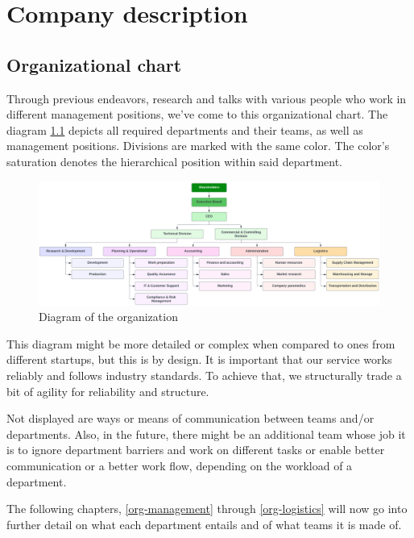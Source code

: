 \chapter{Company description}
\section{Organizational chart}\label{org-chart}
Through previous endeavors, research and talks with various people who work in different management positions, we've come to this organizational chart. The diagram \ref{fig:organisational-chart} depicts all required departments and their teams, as well as management positions. Divisions are marked with the same color. The color's saturation denotes the hierarchical position within said department.

\begin{figure}[!ht]
  \centering
  \includegraphics[width=\linewidth]{./images/organisational-chart.png}
  \caption[Organizational chart made with lucidchart.com]{Diagram of the organization}
  \label{fig:organisational-chart}
\end{figure}

This diagram might be more detailed or complex when compared to ones from different startups, but this is by design. It is important that our service works reliably and follows industry standards. To achieve that, we structurally trade a bit of agility for reliability and structure.

Not displayed are ways or means of communication between teams and/or departments. Also, in the future, there might be an additional team whose job it is to ignore department barriers and work on different tasks or enable better communication or a better work flow, depending on the workload of a department.

The following chapters, \ref{org-management} through \ref{org-logistics} will now go into further detail on what each department entails and of what teams it is made of.

